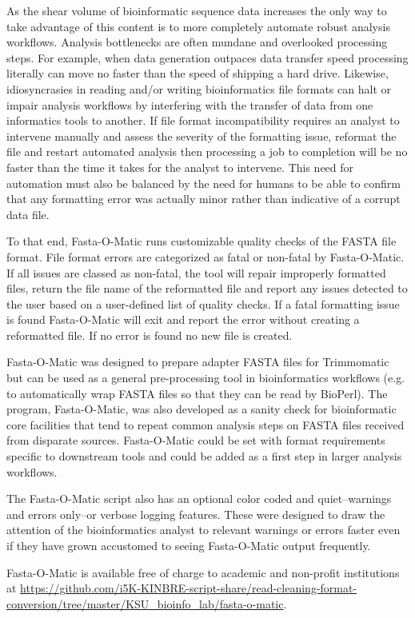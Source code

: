 As the shear volume of bioinformatic sequence data increases the only way to take advantage of this content is to more completely automate robust analysis workflows. Analysis bottlenecks are often mundane and overlooked processing steps. For example, when data generation outpaces data transfer speed processing literally can move no faster than the speed of shipping a hard drive. Likewise, idiosyncrasies in reading and/or writing bioinformatics file formats can halt or impair analysis workflows by interfering with the transfer of data from one informatics tools to another. If file format incompatibility requires an analyst to intervene manually and assess the severity of the formatting issue, reformat the file and restart automated analysis then processing a job to completion will be no faster than the time it takes for the analyst to intervene. This need for automation must also be balanced by the need for humans to be able to confirm that any formatting error was actually minor rather than indicative of a corrupt data file. 

To that end, Fasta-O-Matic runs customizable quality checks of the FASTA file format. File format errors are categorized as fatal or non-fatal by Fasta-O-Matic.  If all issues are classed as non-fatal, the tool will repair improperly formatted files, return the file name of the reformatted file and report any issues detected to the user based on a user-defined list of quality checks. If a fatal formatting issue is found Fasta-O-Matic will exit and report the error without creating a reformatted file. If no error is found no new file is created.

Fasta-O-Matic was designed to prepare adapter FASTA files for Trimmomatic but can be used as a general pre-processing tool in bioinformatics workflows (e.g. to automatically wrap FASTA files so that they can be read by BioPerl). The program, Fasta-O-Matic, was also developed as a sanity check for bioinformatic core facilities that tend to repeat common analysis steps on FASTA files received from disparate sources. Fasta-O-Matic could be set with format requirements specific to downstream tools and could be added as a first step in larger analysis workflows.

The Fasta-O-Matic script also has an optional color coded and quiet--warnings and errors only--or verbose logging features. These were designed to draw the attention of the bioinformatics analyst to relevant warnings or errors faster even if they have grown accustomed to seeing Fasta-O-Matic output frequently.

Fasta-O-Matic is available free of charge to academic and non-profit institutions at \url{https://github.com/i5K-KINBRE-script-share/read-cleaning-format-conversion/tree/master/KSU\_bioinfo\_lab/fasta-o-matic}.